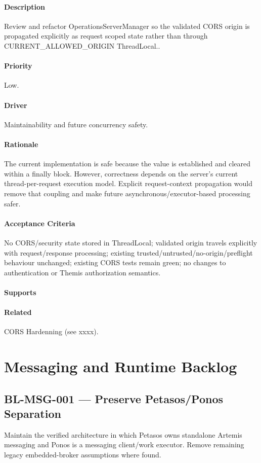 \paragraph{Description}
Review and refactor OperationsServerManager so the validated CORS origin is propagated explicitly as request scoped state rather than through CURRENT\_ALLOWED\_ORIGIN ThreadLocal..
\paragraph{Priority} 
Low.
\paragraph{Driver} 
Maintainability and future concurrency safety.
\paragraph{Rationale} 
The current implementation is safe because the value is established and cleared within a finally block. However, correctness depends on the server's current thread-per-request execution model. Explicit request-context propagation would remove that coupling and make future asynchronous/executor-based processing safer.
\paragraph{Acceptance Criteria} 
No CORS/security state stored in ThreadLocal; validated origin travels explicitly with request/response processing; existing trusted/untrusted/no-origin/preflight behaviour unchanged; existing CORS tests remain green; no changes to authentication or Themis authorization semantics.
\paragraph{Supports} 

\paragraph{Related} 
CORS Hardenning (see xxxx).

\section{Messaging and Runtime Backlog}

\subsection{BL-MSG-001 --- Preserve Petasos/Ponos Separation}
Maintain the verified architecture in which Petasos owns standalone Artemis messaging and Ponos is a messaging client/work executor. Remove remaining legacy embedded-broker assumptions where found.

